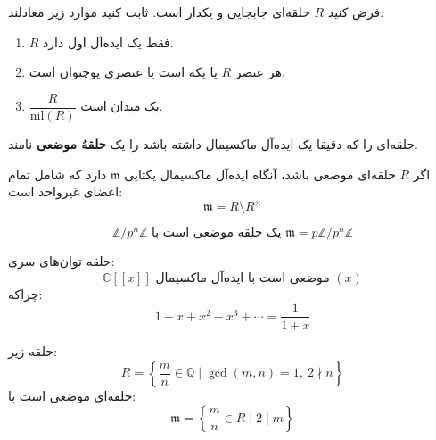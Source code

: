 \section{}

\begin{exercise}
    فرض کنید \( R \) حلقه‌ای جابجایی و یکدار است. ثابت کنید موارد زیر معادلند:
    \begin{enumerate}
        \item \( R \) فقط یک ایده‌آل اول دارد.
        \item هر عنصر  \( R \) یا یکه است یا عنصری پوچتوان است.
        \item \( \dfrac{R}{\mathrm{nil}(R)} \) یک میدان است.
    \end{enumerate}
\end{exercise}

\begin{definition}
    حلقه‌ای را که دقیقا یک ایده‌آل ماکسیمال داشته باشد را یک
     \textbf{حلقهُ موضعی}
      نامند.
\end{definition}
\begin{tcolorbox}[colback=red!5!white, colframe=red!75!black, title={قضیه}]
    اگر $R$ حلقه‌ای موضعی باشد، آنگاه ایده‌آل ماکسیمال یکتایی $\mathfrak{m}$ دارد که شامل تمام اعضای غیرواحد است:
    \[
        \mathfrak{m} = R \setminus R^\times
    \]
\end{tcolorbox}

\bigskip

\begin{tcolorbox}[colback=blue!5!white, colframe=blue!75!black, title={مثال}]
    \[
        \mathbb{Z}/p^n\mathbb{Z} \text{ یک حلقه موضعی است با } \mathfrak{m} = p\mathbb{Z}/p^n\mathbb{Z}
    \]
\end{tcolorbox}

\begin{tcolorbox}[colback=blue!5!white, colframe=blue!75!black, title={مثال}]
    حلقه توان‌های سری:
    \[
        \mathbb{C}[[x]] \text{ موضعی است با ایده‌آل ماکسیمال } (x)
    \]
    چراکه:
    \[
        1 - x + x^2 - x^3 + \cdots = \frac{1}{1 + x}
    \]
\end{tcolorbox}

\begin{tcolorbox}[colback=blue!5!white, colframe=blue!75!black, title={مثال}]
    حلقه زیر:
    \[
        R = \left\{ \frac{m}{n} \in \mathbb{Q} \mid \gcd(m, n) = 1,\ 2 \nmid n \right\}
    \]
    حلقه‌ای موضعی است با:
    \[
        \mathfrak{m} = \left\{ \frac{m}{n} \in R \mid 2 \mid m \right\}
    \]
\end{tcolorbox}


